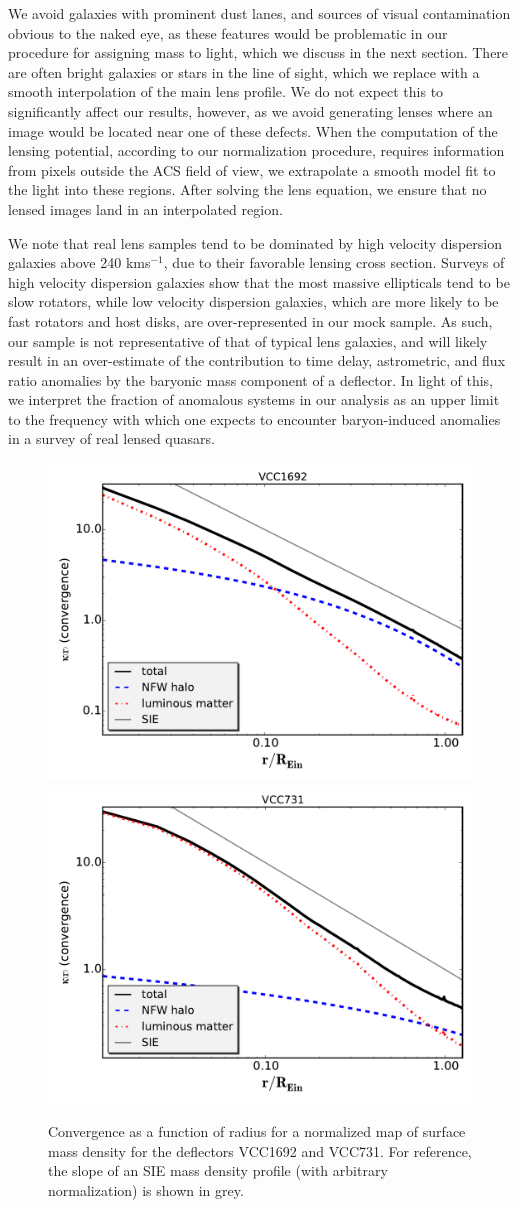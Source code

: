 We avoid galaxies with prominent dust lanes, and sources of visual contamination obvious to the naked eye, as these features would be problematic in our procedure for assigning mass to light, which we discuss in the next section. There are often bright galaxies or stars in the line of sight, which we replace with a smooth interpolation of the main lens profile. We do not expect this to significantly affect our results, however, as we avoid generating lenses where an image would be located near one of these defects. When the computation of the lensing potential, according to our normalization procedure, requires information from pixels outside the ACS field of view, we extrapolate a smooth model fit to the light into these regions. After solving the lens equation, we ensure that no lensed images land in an interpolated region.

We note that real lens samples tend to be dominated by high velocity dispersion galaxies above 240 kms$^{-1}$\cite{Aug++10,PaperIV}, due to their favorable lensing cross section. Surveys of high velocity dispersion galaxies \cite[e.g.][]{MassiveV} show that the most massive ellipticals tend to be slow rotators, while low velocity dispersion galaxies, which are more likely to be fast rotators and host disks, are over-represented in our mock sample. As such, our sample is not representative of that of typical lens galaxies, and will likely result in an over-estimate of the contribution to time delay, astrometric, and flux ratio anomalies by the baryonic mass component of a deflector. In light of this, we interpret the fraction of anomalous systems in our analysis as an upper limit to the frequency with which one expects to encounter baryon-induced anomalies in a survey of real lensed quasars.
\begin{figure}
	{\includegraphics[trim=0cm 0.6cm 0cm
		0cm,clip,width=.48\textwidth]{./figures_sls/VCC1692r_vs_kap-eps-converted-to.pdf}}
	{\includegraphics[trim=0cm .6cm 0cm
		0cm,clip,width=.48\textwidth]{./figures_sls/VCC731r_vs_kap-eps-converted-to.pdf}}
	\caption{\label{fig:r_vs_kap}Convergence as a function of radius for a normalized map of surface mass density for the deflectors VCC1692 and VCC731. For reference, the slope of an SIE mass density profile (with arbitrary normalization) is shown in grey.}
\end{figure} 
